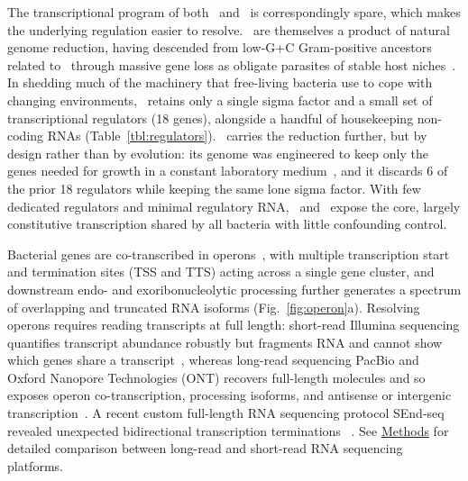 The transcriptional program of both \syn~and \syna~is correspondingly spare, which makes the underlying regulation easier to resolve.
\Mycs~are themselves a product of natural genome reduction, having descended from low-G+C Gram-positive ancestors related to \Bsub~through massive gene loss as obligate parasites of stable host niches~\cite{razin_molecular_1998}.
In shedding much of the machinery that free-living bacteria use to cope with changing environments, \syn~retains only a single sigma factor and a small set of transcriptional regulators (18 genes), alongside a handful of housekeeping non-coding RNAs (Table~\ref{tbl:regulators}).
\syna~carries the reduction further, but by design rather than by evolution: its genome was engineered to keep only the genes needed for growth in a constant laboratory medium~\cite{hutchison_design_2016, breuer_essential_2019}, and it discards 6 of the prior 18 regulators while keeping the same lone sigma factor.
With few dedicated regulators and minimal regulatory RNA, \syn~and \syna~expose the core, largely constitutive transcription shared by all bacteria with little confounding control.

Bacterial genes are co-transcribed in operons~\cite{jacob_genetic_1961}, with multiple transcription start and termination sites (TSS and TTS) acting across a single gene cluster, and downstream endo- and exoribonucleolytic processing further generates a spectrum of overlapping and truncated RNA isoforms (Fig.~\ref{fig:operon}a).
Resolving operons requires reading transcripts at full length: short-read Illumina sequencing quantifies transcript abundance robustly but fragments RNA and cannot show which genes share a transcript~\cite{stark_rna_2019}, whereas long-read sequencing PacBio and Oxford Nanopore Technologies (ONT) recovers full-length molecules and so exposes operon co-transcription, processing isoforms, and antisense or intergenic transcription~\cite{yan_smrt-cappable-seq_2018, grunberger_nanopore_2022}. A recent custom full-length RNA sequencing protocol SEnd-seq revealed unexpected bidirectional transcription terminations~\cite{ju_full-length_2019} . See \hyperref[method:rnaseq]{Methods} for detailed comparison between long-read and short-read RNA sequencing platforms.

